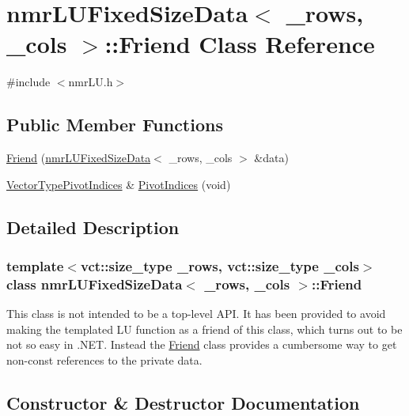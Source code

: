 \hypertarget{classnmr_l_u_fixed_size_data_1_1_friend}{}\section{nmr\+L\+U\+Fixed\+Size\+Data$<$ \+\_\+rows, \+\_\+cols $>$\+:\+:Friend Class Reference}
\label{classnmr_l_u_fixed_size_data_1_1_friend}


{\ttfamily \#include $<$nmr\+L\+U.\+h$>$}

\subsection*{Public Member Functions}
\begin{DoxyCompactItemize}
\item 
\hyperlink{classnmr_l_u_fixed_size_data_1_1_friend_a9630e8ee3617a9143a11e810a2dd69a4}{Friend} (\hyperlink{classnmr_l_u_fixed_size_data}{nmr\+L\+U\+Fixed\+Size\+Data}$<$ \+\_\+rows, \+\_\+cols $>$ \&data)
\item 
\hyperlink{classnmr_l_u_fixed_size_data_aa44bd56146e161d7b56d7f2001153ccb}{Vector\+Type\+Pivot\+Indices} \& \hyperlink{classnmr_l_u_fixed_size_data_1_1_friend_abccc84b7efae323aaf3ca5bd069787f1}{Pivot\+Indices} (void)
\end{DoxyCompactItemize}


\subsection{Detailed Description}
\subsubsection*{template$<$vct\+::size\+\_\+type \+\_\+rows, vct\+::size\+\_\+type \+\_\+cols$>$class nmr\+L\+U\+Fixed\+Size\+Data$<$ \+\_\+rows, \+\_\+cols $>$\+::\+Friend}

This class is not intended to be a top-\/level A\+P\+I. It has been provided to avoid making the templated L\+U function as a friend of this class, which turns out to be not so easy in .N\+E\+T. Instead the \hyperlink{classnmr_l_u_fixed_size_data_1_1_friend}{Friend} class provides a cumbersome way to get non-\/const references to the private data. 

\subsection{Constructor \& Destructor Documentation}
\hypertarget{classnmr_l_u_fixed_size_data_1_1_friend_a9630e8ee3617a9143a11e810a2dd69a4}{}
